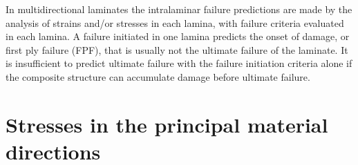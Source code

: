 \documentclass{AeroStructure-ERJohnson}
\begin{document}

In multidirectional laminates the intralaminar failure predictions are made by the analysis of strains and/or stresses in each lamina, with failure criteria evaluated in each lamina. A failure initiated in one lamina predicts the onset of damage, or first ply failure (FPF), that is usually not the ultimate failure of the laminate. It is insufficient to predict ultimate failure with the failure initiation criteria alone if the composite structure can accumulate damage before ultimate failure.

\clearpage

\section{Stresses in the principal material directions}\label{sec9.2}
\end{document}
